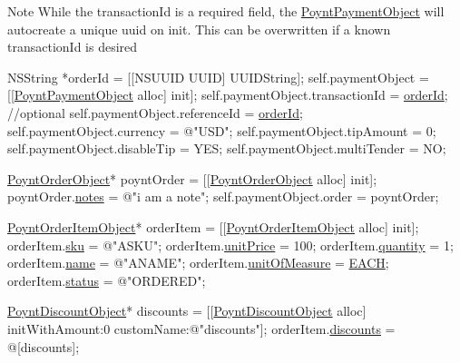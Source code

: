 \begin{DoxyNote}{Note}
While the transaction\+Id is a required field, the \hyperlink{interface_poynt_payment_object}{Poynt\+Payment\+Object} will autocreate a unique uuid on init. This can be overwritten if a known transaction\+Id is desired 
\begin{DoxyCode}
NSString *orderId = [[NSUUID UUID] UUIDString];
\textcolor{keyword}{self}.paymentObject = [[\hyperlink{interface_poynt_payment_object}{PoyntPaymentObject} alloc] init];
\textcolor{keyword}{self}.paymentObject.transactionId = \hyperlink{interface_poynt_payment_object_aac2b120e80b4b9e69c3a577c4f31ed31}{orderId}; \textcolor{comment}{//optional}
\textcolor{keyword}{self}.paymentObject.referenceId = \hyperlink{interface_poynt_payment_object_aac2b120e80b4b9e69c3a577c4f31ed31}{orderId};
\textcolor{keyword}{self}.paymentObject.currency = \textcolor{stringliteral}{@"USD"};
\textcolor{keyword}{self}.paymentObject.tipAmount = 0;
\textcolor{keyword}{self}.paymentObject.disableTip = YES;
\textcolor{keyword}{self}.paymentObject.multiTender = NO;

\hyperlink{interface_poynt_order_object}{PoyntOrderObject}* poyntOrder = [[\hyperlink{interface_poynt_order_object}{PoyntOrderObject} alloc] init];
poyntOrder.\hyperlink{interface_poynt_order_object_a940861134b75ee3d5167d791e5422afe}{notes} = \textcolor{stringliteral}{@"i am a note"};
\textcolor{keyword}{self}.paymentObject.order = poyntOrder;

\hyperlink{interface_poynt_order_item_object}{PoyntOrderItemObject}* orderItem = [[\hyperlink{interface_poynt_order_item_object}{PoyntOrderItemObject} alloc] 
      init];
orderItem.\hyperlink{interface_poynt_order_item_object_a40fae7616715aeb5f241af769a5f55b4}{sku} = \textcolor{stringliteral}{@"ASKU"};
orderItem.\hyperlink{interface_poynt_order_item_object_a4655acbe158688f583828a9a3b61a6aa}{unitPrice} = 100;
orderItem.\hyperlink{interface_poynt_order_item_object_ab39715c10682638e342e25893caa7372}{quantity} = 1;
orderItem.\hyperlink{interface_poynt_order_item_object_a4b93d352d2fca75b34e1b5a50e03f587}{name} = \textcolor{stringliteral}{@"ANAME"};
orderItem.\hyperlink{interface_poynt_order_item_object_a8381a2b60fb912bab67a5218ba3ad058}{unitOfMeasure} = \hyperlink{_poynt_order_item_object_8h_a7a5dd044bd57739d1d1b3e3565fbac25a230bc1794689a94bd302517282cb4e88}{EACH};
orderItem.\hyperlink{interface_poynt_order_item_object_ac2acf327011ce6ed9e26a41ceddaee31}{status} = \textcolor{stringliteral}{@"ORDERED"};

\hyperlink{interface_poynt_discount_object}{PoyntDiscountObject}* discounts = [[\hyperlink{interface_poynt_discount_object}{PoyntDiscountObject} alloc] 
      initWithAmount:0 customName:\textcolor{stringliteral}{@"discounts"}];
orderItem.\hyperlink{interface_poynt_order_item_object_a203259381417b0a34916ce3f864161c2}{discounts} = @[discounts];


\end{DoxyCode}
\end{DoxyNote}
